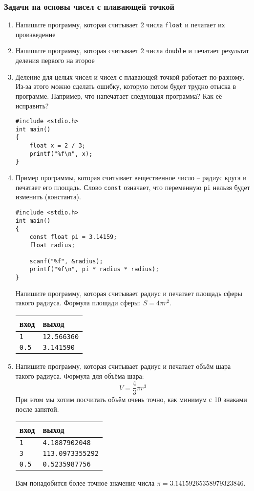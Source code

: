 \documentclass{article}
\begin{document}
\subsubsection*{Задачи на основы чисел с плавающей точкой}
\begin{enumerate}
\item Напишите программу, которая считывает 2 числа \texttt{float} и печатает их произведение
\item Напишите программу, которая считывает 2 числа \texttt{double} и печатает результат деления первого на второе
\item Деление для целых чисел и чисел с плавающей точкой работает по-разному. Из-за этого можно сделать ошибку, которую потом будет трудно отыска в программе. Например, что напечатает следующая программа? Как её исправить?
\begin{lstlisting}
#include <stdio.h>
int main() 
{
    float x = 2 / 3;
    printf("%f\n", x);
}
\end{lstlisting}

\item Пример программы, которая считывает вещественное число -- радиус круга и печатает его площадь. Слово \texttt{const} означает, что переменную \texttt{pi} нельзя будет изменить (константа).
\begin{lstlisting}
#include <stdio.h>
int main() 
{
    const float pi = 3.14159;
    float radius;
	
    scanf("%f", &radius);
    printf("%f\n", pi * radius * radius);
}
\end{lstlisting}
Напишите программу, которая считывает радиус и печатает площадь сферы такого радиуса. Формула площади сферы: $S = 4 \pi r^2$.
\begin{center}
\begin{tabular}{ l l }
 вход & выход \\ \hline
 \texttt{1} & \texttt{12.566360}  \\ 
 \texttt{0.5} & \texttt{3.141590}  \\
\end{tabular}
\end{center}

\item Напишите программу, которая считывает радиус и печатает объём шара такого радиуса. Формула для объёма шара: 
$$V = \frac{4}{3} \pi r^3$$
При этом мы хотим посчитать объём очень точно, как минимум с 10 знаками после запятой.
\begin{center}
\begin{tabular}{ l l }
 вход & выход \\ \hline
 \texttt{1} & \texttt{4.1887902048}  \\ 
 \texttt{3} & \texttt{113.0973355292}  \\ 
 \texttt{0.5} & \texttt{0.5235987756}  \\
\end{tabular}
\end{center}
Вам понадобится более точное значение числа $\pi = 3.14159265358979323846$.
\end{enumerate}
\end{document}
